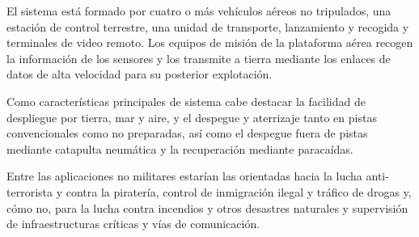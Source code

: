 El sistema está formado por cuatro o más vehículos aéreos no tripulados, una estación de control terrestre, una unidad de transporte, lanzamiento y recogida y terminales de video remoto. Los equipos de misión de la plataforma aérea recogen la información de los sensores y los transmite a tierra mediante los enlaces de datos de alta velocidad para su posterior explotación.

Como características principales de sistema cabe destacar la facilidad de despliegue por tierra, mar y aire, y el despegue y aterrizaje tanto en pistas convencionales como no preparadas, así como el despegue fuera de pistas mediante catapulta neumática y la recuperación mediante paracaídas.

Entre las aplicaciones no militares estarían las orientadas hacia la lucha anti-terrorista y contra la piratería, control de inmigración ilegal y tráfico de drogas y, cómo no, para la lucha contra incendios y otros desastres naturales y supervisión de infraestructuras críticas y vías de comunicación.


